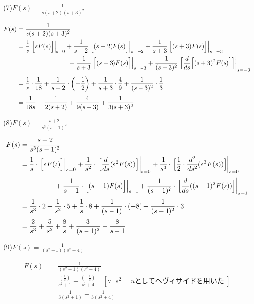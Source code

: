 \documentclass[a4paper,12pt]{report}
\begin{document}
  \newpage

  (7)\quad \( F(s) = \frac{1}{s(s+2)(s+3)^2} \) 

  \begin{align*}
    F(s) &= \frac{1}{s(s+2)(s+3)^2} \\
         &= \frac{1}{s} \left.\Bigl[sF(s)\Bigr]\right|_{s=0}
          + \frac{1}{s+2} \left.\Bigl[(s+2)F(s)\Bigr]\right|_{s=-2}
          + \frac{1}{s+3} \left.\Bigl[(s+3)F(s)\Bigr]\right|_{s=-3}\\
          &\qquad \qquad \qquad \qquad 
          + \frac{1}{s+3} \left.\Bigl[(s+3)F(s)\Bigr]\right|_{s=-3}
          + \frac{1}{(s+3)^2} \left.\Bigl[\frac{d}{ds}\Bigl[(s+3)^2F(s)\Bigr]\Bigr]\right|_{s=-3} \\[1mm]
         &= \frac{1}{s} \cdot \frac{1}{18}
          + \frac{1}{s+2} \cdot \left(-\frac{1}{2}\right)
          + \frac{1}{s+3} \cdot \frac{4}{9}
          + \frac{1}{(s+3)^2} \cdot \frac{1}{3} \\[1mm]
         &= \frac{1}{18s} - \frac{1}{2(s+2)} + \frac{4}{9(s+3)} + \frac{1}{3(s+3)^2}
  \end{align*}

  (8)\quad \( F(s) = \frac{s+2}{s^3(s-1)^2} \) 

  \begin{align*}
    F(s) &= \frac{s+2}{s^3(s-1)^2} \\
         &= \frac{1}{s} \cdot \left.\Bigl[sF(s)\Bigr]\right|_{s=0}
          + \frac{1}{s^2} \cdot \left.\Bigl[\frac{d}{ds}(s^2F(s))\Bigr]\right|_{s=0}
          + \frac{1}{s^3} \cdot \left.\Bigl[\frac{1}{2} \cdot \frac{d^2}{ds^2}(s^3F(s))\Bigr]\right|_{s=0} \\[1mm]
         &\quad \quad \quad \quad \quad + \frac{1}{s-1} \cdot \left.\Bigl[(s-1)F(s)\Bigr]\right|_{s=1}
          + \frac{1}{(s-1)^2} \cdot \left.\Bigl[\frac{d}{ds}((s-1)^2F(s))\Bigr]\right|_{s=1} \\[1mm]
         &= \frac{1}{s^3}\cdot 2 + \frac{1}{s^2}\cdot 5 + \frac{1}{s}\cdot 8 
          + \frac{1}{(s-1)}\cdot (-8) + \frac{1}{(s-1)^2}\cdot 3 \\[1mm]
         &= \frac{2}{s^3} + \frac{5}{s^2} + \frac{8}{s} + \frac{3}{(s-1)^2} - \frac{8}{s-1}
  \end{align*}

  (9)\quad \( F(s) = \frac{1}{(s^2+1)(s^2+4)} \)
  
  \begin{align*}
    F(s) &= \frac{1}{(s^2+1)(s^2+4)} \\
         &= \frac{(\frac{1}{3})}{s^2 + 1} + \frac{(-\frac{1}{3})}{s^2 + 4}
         \quad [\because \text{ \(s^2=u\)としてヘヴィサイドを用いた }] \\[1mm]
         &= \frac{1}{3(s^2 + 1)} - \frac{1}{3(s^2 + 4)}
  \end{align*}
\end{document}
